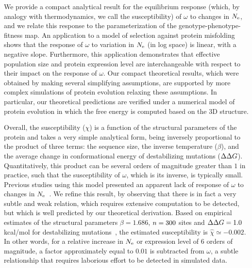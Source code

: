 We provide a compact analytical result for the equilibrium response (which, by analogy with thermodynamics, we call the susceptibility) of $\omega$ to changes in $N_{\text{e}}$, and we relate this response to the parameterization of the genotype-phenotype-fitness map.
An application to a model of selection against protein misfolding shows that the response of $\omega$ to variation in $N_{\text{e}}$ (in log space) is linear, with a negative slope.
Furthermore, this application demonstrates that {effective population size} and protein expression level are interchangeable with respect to their impact on the response of $\omega$.
Our compact theoretical results, which were obtained by making several simplifying assumptions, are supported by more complex simulations of protein evolution relaxing these assumptions.
In particular, our theoretical predictions are verified under a numerical model of protein evolution in which the free energy is computed based on the 3D structure.

Overall, the susceptibility ($\chi$) is a function of the structural parameters of the protein and takes a very simple analytical form, being inversely proportional to the product of three terms: the sequence size, the inverse temperature ($\beta$), and the average change in conformational energy of destabilizing mutations ($\Delta \Delta G$).
Quantitatively, this product can be several orders of magnitude greater than $1$ in practice, such that the susceptibility of $\omega$, which is its inverse, is typically small.
Previous studies using this model presented an apparent lack of response of $\omega$ to changes in $N_{\text{e}}$~\citep{Goldstein2013}.
We refine this result, by observing that there is in fact a very subtle and weak relation, which requires extensive computation to be detected, but which is well predicted by our theoretical derivation.
Based on empirical estimates of the structural parameters $\beta = 1.686$, $n=300$ sites and $\Delta \Delta G = 1.0$ kcal/mol for destabilizing mutations~\citep{Zeldovich2007}, the estimated susceptibility is $\hat{\chi} \simeq -0.002$.
In other words, for a relative increase in $N_{\text{e}}$ or expression level of $6$ orders of magnitude, a factor approximately equal to $0.01$ is subtracted from $\omega$, a subtle relationship that requires laborious effort to be detected in simulated data.

